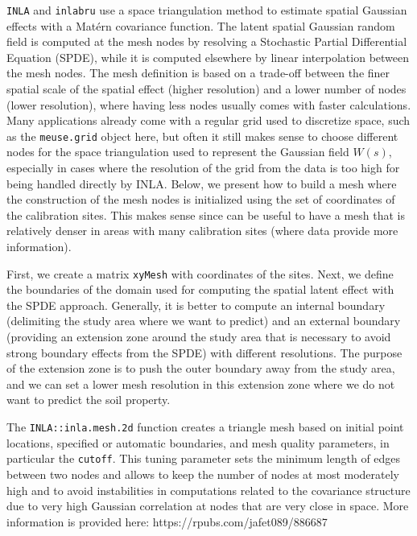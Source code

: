 \documentclass[
  a4paper,
]{article}
\begin{document}
\texttt{INLA} and \texttt{inlabru} use a space triangulation method to
estimate spatial Gaussian effects with a Matérn covariance function. The
latent spatial Gaussian random field is computed at the mesh nodes by
resolving a Stochastic Partial Differential Equation (SPDE), while it is
computed elsewhere by linear interpolation between the mesh nodes. The
mesh definition is based on a trade-off between the finer spatial scale
of the spatial effect (higher resolution) and a lower number of nodes
(lower resolution), where having less nodes usually comes with faster
calculations. Many applications already come with a regular grid used to
discretize space, such as the \texttt{meuse.grid} object here, but often
it still makes sense to choose different nodes for the space
triangulation used to represent the Gaussian field \(W(s)\), especially
in cases where the resolution of the grid from the data is too high for
being handled directly by INLA. Below, we present how to build a mesh
where the construction of the mesh nodes is initialized using the set of
coordinates of the calibration sites. This makes sense since can be
useful to have a mesh that is relatively denser in areas with many
calibration sites (where data provide more information).

First, we create a matrix \texttt{xyMesh} with coordinates of the sites.
Next, we define the boundaries of the domain used for computing the
spatial latent effect with the SPDE approach. Generally, it is better to
compute an internal boundary (delimiting the study area where we want to
predict) and an external boundary (providing an extension zone around
the study area that is necessary to avoid strong boundary effects from
the SPDE) with different resolutions. The purpose of the extension zone
is to push the outer boundary away from the study area, and we can set a
lower mesh resolution in this extension zone where we do not want to
predict the soil property.

The \texttt{INLA::inla.mesh.2d} function creates a triangle mesh based
on initial point locations, specified or automatic boundaries, and mesh
quality parameters, in particular the \texttt{cutoff}. This tuning
parameter sets the minimum length of edges between two nodes and allows
to keep the number of nodes at most moderately high and to avoid
instabilities in computations related to the covariance structure due to
very high Gaussian correlation at nodes that are very close in space.
More information is provided here: https://rpubs.com/jafet089/886687
\end{document}

